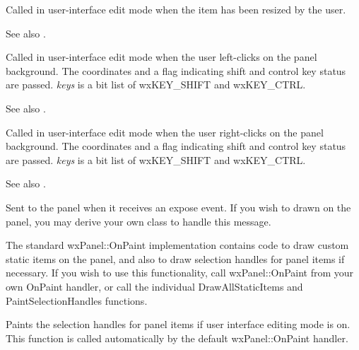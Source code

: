 

Called in user-interface edit mode when the item has been resized by the user.

See also .



Called in user-interface edit mode when the user left-clicks on the
panel background. The coordinates and a flag indicating shift and control
key status are passed. {\it keys} is a bit list of wxKEY\_SHIFT and wxKEY\_CTRL.

See also .



Called in user-interface edit mode when the user right-clicks on the
panel background. The coordinates and a flag indicating shift and control
key status are passed. {\it keys} is a bit list of wxKEY\_SHIFT and wxKEY\_CTRL.

See also .



Sent to the panel when it receives an expose event. If you wish to drawn
on the panel, you may derive your own class to handle this message.

The standard wxPanel::OnPaint implementation contains code to draw
custom static items on the panel, and also to draw selection
handles for panel items if necessary. If you wish to use this functionality,
call wxPanel::OnPaint from your own OnPaint handler, or call
the individual DrawAllStaticItems and PaintSelectionHandles functions.



Paints the selection handles for panel items if user
interface editing mode is on. This function is
called automatically by the default wxPanel::OnPaint handler.

